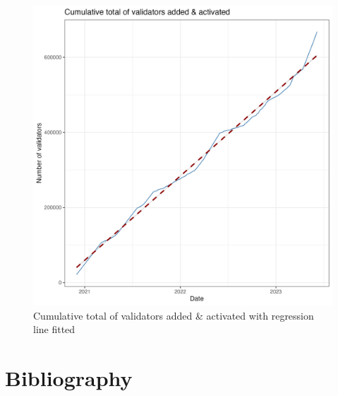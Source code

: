 \documentclass[UTF8]{article}
\begin{document}
 \begin{figure}[htbp]
\begin{center}
\includegraphics[width=\linewidth]{images/cumulative_validator_plot_with_regression_line_230607}
\caption{Cumulative total of validators added \& activated with regression line fitted}
\label{fig:cumulativevalidatorsregression}
\end{center}
\end{figure}

\clearpage

\section{Bibliography}
\nocite{*}


\end{document}
